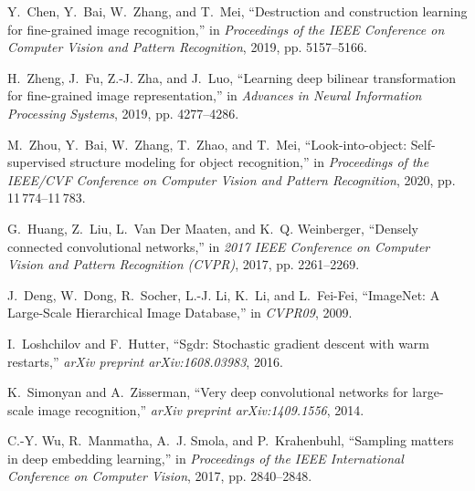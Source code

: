 \documentclass[conference]{IEEEtran}
\begin{document}
\begin{thebibliography}{10}
Y.~Chen, Y.~Bai, W.~Zhang, and T.~Mei, ``Destruction and construction learning
  for fine-grained image recognition,'' in \emph{Proceedings of the IEEE
  Conference on Computer Vision and Pattern Recognition}, 2019, pp. 5157--5166.

H.~Zheng, J.~Fu, Z.-J. Zha, and J.~Luo, ``Learning deep bilinear transformation
  for fine-grained image representation,'' in \emph{Advances in Neural
  Information Processing Systems}, 2019, pp. 4277--4286.

M.~Zhou, Y.~Bai, W.~Zhang, T.~Zhao, and T.~Mei, ``Look-into-object:
  Self-supervised structure modeling for object recognition,'' in
  \emph{Proceedings of the IEEE/CVF Conference on Computer Vision and Pattern
  Recognition}, 2020, pp. 11\,774--11\,783.

G.~{Huang}, Z.~{Liu}, L.~{Van Der Maaten}, and K.~Q. {Weinberger}, ``Densely
  connected convolutional networks,'' in \emph{2017 IEEE Conference on Computer
  Vision and Pattern Recognition (CVPR)}, 2017, pp. 2261--2269.

J.~Deng, W.~Dong, R.~Socher, L.-J. Li, K.~Li, and L.~Fei-Fei, ``{ImageNet: A
  Large-Scale Hierarchical Image Database},'' in \emph{CVPR09}, 2009.

I.~Loshchilov and F.~Hutter, ``Sgdr: Stochastic gradient descent with warm
  restarts,'' \emph{arXiv preprint arXiv:1608.03983}, 2016.

K.~Simonyan and A.~Zisserman, ``Very deep convolutional networks for
  large-scale image recognition,'' \emph{arXiv preprint arXiv:1409.1556}, 2014.

C.-Y. Wu, R.~Manmatha, A.~J. Smola, and P.~Krahenbuhl, ``Sampling matters in
  deep embedding learning,'' in \emph{Proceedings of the IEEE International
  Conference on Computer Vision}, 2017, pp. 2840--2848.

\end{thebibliography}
 
\end{document}
